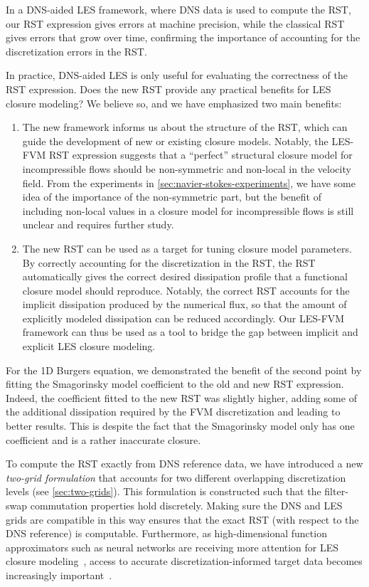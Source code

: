 \documentclass[preprint,twocolumn,5p]{elsarticle}
\begin{document}
In a DNS-aided LES framework, where DNS data is used to compute the RST, our
RST expression gives errors at machine precision, while the classical RST
gives errors that grow over time, confirming the importance of accounting for
the discretization errors in the RST.

In practice, DNS-aided LES is only useful for evaluating the correctness of the
RST expression.
Does the new RST provide any practical benefits for LES closure modeling?
We believe so, and we have emphasized two main benefits:
\begin{enumerate}
    \item The new framework informs us about the structure of the RST, which
        can guide the development of new or existing closure models.
        Notably, the LES-FVM RST expression suggests that a ``perfect''
        structural closure model for incompressible flows should be
        non-symmetric and non-local in the velocity field. From the
        experiments in \cref{sec:navier-stokes-experiments}, we have some idea
        of the importance of the non-symmetric part, but the benefit of
        including non-local values in a closure model for incompressible flows
        is still unclear and requires further study.
    \item The new RST can be used as a target for tuning closure model
        parameters.
        By correctly accounting for the discretization in the RST,
        the RST automatically gives the correct desired dissipation profile
        that a functional closure model should reproduce. Notably, the correct
        RST accounts for the implicit dissipation produced by the numerical
        flux, so that the amount of explicitly modeled dissipation can be
        reduced accordingly. Our LES-FVM framework can thus be used as a tool
        to bridge the gap between implicit and explicit LES closure modeling.
\end{enumerate}

For the 1D Burgers equation, we demonstrated the benefit of the second point
by fitting the Smagorinsky model coefficient to the old and new RST
expression. Indeed, the coefficient fitted to the new RST was slightly higher,
adding some of the additional dissipation required by the FVM discretization
and leading to better results. This is despite the fact that the Smagorinsky
model only has one coefficient and is a rather inaccurate closure.

To compute the RST exactly from DNS reference data, we have introduced a new 
\emph{two-grid formulation} that accounts for two different overlapping
discretization levels (see \ref{sec:two-grids}).
This formulation is constructed such that the filter-swap commutation
properties hold discretely.
Making sure the DNS and LES grids are compatible in this way ensures that the
exact RST (with respect to the DNS reference) is computable.
Furthermore, as high-dimensional function approximators such as neural networks
are receiving more attention for LES closure
modeling~\cite{sanderseScientificMachineLearning2025}, access to accurate
discretization-informed target data becomes increasingly
important~\cite{beckDiscretizationConsistentClosureSchemes2023}.
\end{document}
